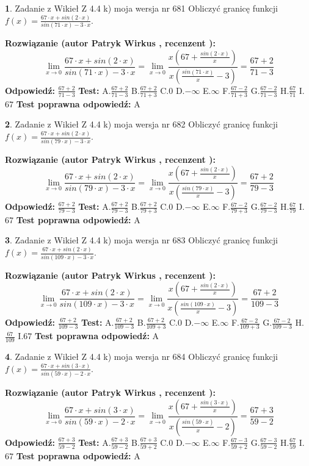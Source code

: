 \documentclass[12pt, a4paper]{article}
\theoremstyle{definition} %
\newtheorem{zad}{}
\newcommand{\zadStart}[1]{\begin{zad}#1\newline}
\newcommand{\zadStop}{\end{zad}}
\newcommand{\rozwStart}[2]{\noindent \textbf{Rozwiązanie (autor #1 , recenzent #2): }\newline}
\newcommand{\rozwStop}{\newline}
\newcommand{\odpStart}{\noindent \textbf{Odpowiedź:}\newline}
\newcommand{\odpStop}{\newline}
\newcommand{\testStart}{\noindent \textbf{Test:}\newline}
\newcommand{\testStop}{\newline}
\newcommand{\kluczStart}{\noindent \textbf{Test poprawna odpowiedź:}\newline}
\newcommand{\kluczStop}{\newline}
\begin{document}
\zadStart{Zadanie z Wikieł Z 4.4 k) moja wersja nr 681}
Obliczyć granicę funkcji $f(x)=\frac{67\cdot x +sin(2\cdot x)}{sin(71\cdot x) -3\cdot x}$.
\zadStop
\rozwStart{Patryk Wirkus}{}
$$\lim\limits_{x\to 0}\frac{67\cdot x +sin(2\cdot x)}{sin(71\cdot x) -3\cdot x}
=\lim\limits_{x\to 0}\frac{x(67+\frac{sin(2\cdot x)}{x})}{x(\frac{sin(71\cdot x)}{x}-3)}
=\frac{67+2}{71-3}$$
\rozwStop
\odpStart
$\frac{67+2}{71-3}$
\odpStop
\testStart
A.$\frac{67+2}{71-3}$
B.$\frac{67+2}{71+3}$
C.$0$
D.$-\infty$
E.$\infty$
F.$\frac{67-2}{71+3}$
G.$\frac{67-2}{71-3}$
H.$\frac{67}{71}$
I.$67$
\testStop
\kluczStart
A
\kluczStop



\zadStart{Zadanie z Wikieł Z 4.4 k) moja wersja nr 682}
Obliczyć granicę funkcji $f(x)=\frac{67\cdot x +sin(2\cdot x)}{sin(79\cdot x) -3\cdot x}$.
\zadStop
\rozwStart{Patryk Wirkus}{}
$$\lim\limits_{x\to 0}\frac{67\cdot x +sin(2\cdot x)}{sin(79\cdot x) -3\cdot x}
=\lim\limits_{x\to 0}\frac{x(67+\frac{sin(2\cdot x)}{x})}{x(\frac{sin(79\cdot x)}{x}-3)}
=\frac{67+2}{79-3}$$
\rozwStop
\odpStart
$\frac{67+2}{79-3}$
\odpStop
\testStart
A.$\frac{67+2}{79-3}$
B.$\frac{67+2}{79+3}$
C.$0$
D.$-\infty$
E.$\infty$
F.$\frac{67-2}{79+3}$
G.$\frac{67-2}{79-3}$
H.$\frac{67}{79}$
I.$67$
\testStop
\kluczStart
A
\kluczStop



\zadStart{Zadanie z Wikieł Z 4.4 k) moja wersja nr 683}
Obliczyć granicę funkcji $f(x)=\frac{67\cdot x +sin(2\cdot x)}{sin(109\cdot x) -3\cdot x}$.
\zadStop
\rozwStart{Patryk Wirkus}{}
$$\lim\limits_{x\to 0}\frac{67\cdot x +sin(2\cdot x)}{sin(109\cdot x) -3\cdot x}
=\lim\limits_{x\to 0}\frac{x(67+\frac{sin(2\cdot x)}{x})}{x(\frac{sin(109\cdot x)}{x}-3)}
=\frac{67+2}{109-3}$$
\rozwStop
\odpStart
$\frac{67+2}{109-3}$
\odpStop
\testStart
A.$\frac{67+2}{109-3}$
B.$\frac{67+2}{109+3}$
C.$0$
D.$-\infty$
E.$\infty$
F.$\frac{67-2}{109+3}$
G.$\frac{67-2}{109-3}$
H.$\frac{67}{109}$
I.$67$
\testStop
\kluczStart
A
\kluczStop



\zadStart{Zadanie z Wikieł Z 4.4 k) moja wersja nr 684}
Obliczyć granicę funkcji $f(x)=\frac{67\cdot x +sin(3\cdot x)}{sin(59\cdot x) -2\cdot x}$.
\zadStop
\rozwStart{Patryk Wirkus}{}
$$\lim\limits_{x\to 0}\frac{67\cdot x +sin(3\cdot x)}{sin(59\cdot x) -2\cdot x}
=\lim\limits_{x\to 0}\frac{x(67+\frac{sin(3\cdot x)}{x})}{x(\frac{sin(59\cdot x)}{x}-2)}
=\frac{67+3}{59-2}$$
\rozwStop
\odpStart
$\frac{67+3}{59-2}$
\odpStop
\testStart
A.$\frac{67+3}{59-2}$
B.$\frac{67+3}{59+2}$
C.$0$
D.$-\infty$
E.$\infty$
F.$\frac{67-3}{59+2}$
G.$\frac{67-3}{59-2}$
H.$\frac{67}{59}$
I.$67$
\testStop
\kluczStart
A
\kluczStop
\end{document}
